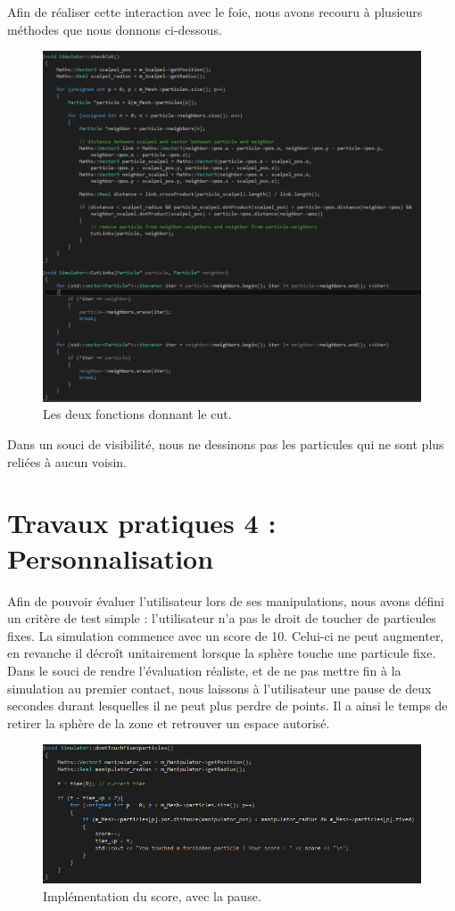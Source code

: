 \documentclass[a4paper,12pt]{article}
\begin{document}
Afin de réaliser cette interaction avec le foie, nous avons recouru à plusieurs méthodes que nous donnons ci-dessous.
\begin{figure}[ht!]
  \centering
  \includegraphics[width=\textwidth]{images/cut_algo.png}
  \caption{Les deux fonctions donnant le cut.}
  \label{fig:cut_algo}
\end{figure}

Dans un souci de visibilité, nous ne dessinons pas les particules qui ne sont plus reliées à aucun voisin. 

\newpage\section{Travaux pratiques 4 : Personnalisation}

Afin de pouvoir évaluer l'utilisateur lors de ses manipulations, nous avons défini un critère de test simple : l'utilisateur n'a pas le droit de toucher de particules fixes.
La simulation commence avec un score de 10. Celui-ci ne peut augmenter, en revanche il décroît unitairement lorsque la sphère touche une particule fixe.
Dans le souci de rendre l'évaluation réaliste, et de ne pas mettre fin à la simulation au premier contact, nous laissons à l'utilisateur une \og{}pause\fg{} de deux secondes durant lesquelles il ne peut plus perdre de points. Il a ainsi le temps de retirer la sphère de la zone et retrouver un espace autorisé.
\begin{figure}[ht!]
  \centering
  \includegraphics[width=\textwidth]{images/score.png}
  \caption{Implémentation du score, avec la pause.}
  \label{fig:score}
\end{figure}
\end{document}
